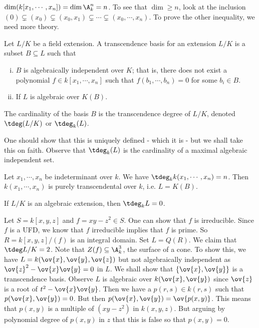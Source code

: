 \begin{ex}
$\dim(k[x_1,\cdots,x_n])=\dim \A_k^n=n$. To see that $\dim \geq n$, look at the inclusion $(0) \subsetneq (x_0) \subsetneq (x_0,x_1) \subsetneq \cdots \subsetneq (x_0,\cdots,x_n)$. To prove the other inequality, we need more theory.
\end{ex}

\begin{dfn}
Let $L/K$ be a field extension. A transcendence basis for an extension $L/K$ is a subset $B \subseteq L$ such that 
\begin{enumerate}[(i)]
\item $B$ is algebraically independent over $K$; that is, there does not exist a polynomial $f \in k[x_1,\cdots,x_n]$ such that $f(b_1,\cdots,b_n)=0$ for some $b_i \in B$. 
\item If $L$ is algebraic over $K(B)$.
\end{enumerate}
The cardinality of the basis $B$ is the transcendence degree of $L/K$, denoted $\tdeg(L/K)$ or $\tdeg_k(L)$.
\end{dfn}

One should show that this is uniquely defined - which it is - but we shall take this on faith. Observe that $\tdeg_k(L)$ is the cardinality of a maximal algebraic independent set.

\begin{ex}
Let $x_1,\cdots,x_n$ be indeterminant over $k$. We have $\tdeg_k k(x_1,\cdots,x_n)=n$. Then $k(x_1,\cdots,x_n)$ is purely transcendental over $k$, i.e. $L=K(B)$.
\end{ex}

\begin{ex}
If $L/K$ is an algebraic extension, then $\tdeg_k L=0$. 
\end{ex}

\begin{ex}
Let $S=k[x,y,z]$ and $f=xy-z^2 \in S$. One can show that $f$ is irreducible. Since $f$ is a UFD, we know that $f$ irreducible implies that $f$ is prime. So $R=k[x,y,z]/(f)$ is an integral domain. Set $L=Q(R)$. We claim that $\tdeg L/K=2$. Note that $Z(f) \subseteq \A_k^3$, the surface of a cone. To show this, we have $L=k(\ov{x},\ov{y},\ov{z})$ but not algebraically independent as $\ov{z}^2-\ov{x} \ov{y}=0$ in $L$. We shall show that $\{\ov{x},\ov{y}\}$ is a transcendence basis. Observe $L$ is algebraic over $k(\ov{x},\ov{y})$ since $\ov{z}$ is a root of $t^2-\ov{x}\ov{y}$. Then we have a $p(r,s) \in k(r,s)$ such that $p(\ov{x},\ov{y})=0$. But then $p(\ov{x},\ov{y})=\ov{p(x,y)}$. This means that $p(x,y)$ is a multiple of $(xy-z^2)$ in $k(x,y,z)$. But arguing by polynomial degree of $p(x,y)$ in $z$ that this is false so that $p(x,y)=0$.
\end{ex}

